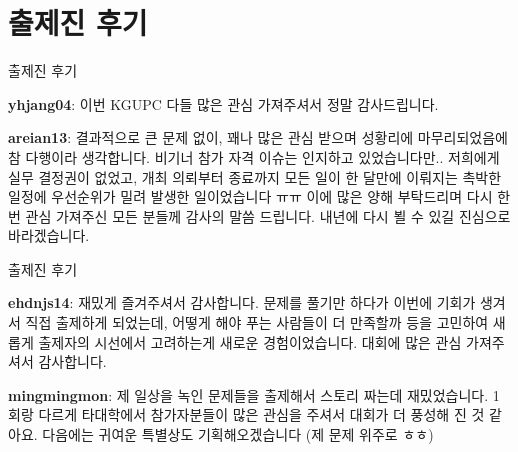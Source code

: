 
\newcommand{\authorreview}[2]{%
    \par\noindent
    {\color{solutio-purple}\bfseries #1}: #2\par
    \medskip
}

\section{출제진 후기}

\begin{frame}[label=afterword]{출제진 후기}
     \authorreview{yhjang04}{
        \textcolor{solutio-gray}{
            이번 KGUPC 다들 많은 관심 가져주셔서 정말 감사드립니다.
        }
    }

    \authorreview{areian13}{
        \textcolor{solutio-gray}{
            결과적으로 큰 문제 없이, 꽤나 많은 관심 받으며 성황리에 마무리되었음에 참 다행이라 생각합니다.
            비기너 참가 자격 이슈는 인지하고 있었습니다만.. 
            저희에게 실무 결정권이 없었고,
            개최 의뢰부터 종료까지 모든 일이 한 달만에 이뤄지는 촉박한 일정에
            우선순위가 밀려 발생한 일이었습니다 ㅠㅠ
            이에 많은 양해 부탁드리며 다시 한 번 관심 가져주신 모든 분들께 감사의 말씀 드립니다.
            내년에 다시 뵐 수 있길 진심으로 바라겠습니다.
        }
    }
\end{frame}




\begin{frame}{출제진 후기}
    \authorreview{ehdnjs14}{
        \textcolor{solutio-gray}{
            재밌게 즐겨주셔서 감사합니다. 
            문제를 풀기만 하다가 이번에 기회가 생겨서 직접 출제하게 되었는데,
            어떻게 해야 푸는 사람들이 더 만족할까 등을 고민하여
            새롭게 출제자의 시선에서 고려하는게 새로운 경험이었습니다.
            대회에 많은 관심 가져주셔서 감사합니다. 
        }
    }

    \authorreview{mingmingmon}{
        \textcolor{solutio-gray}{
            제 일상을 녹인 문제들을 출제해서 스토리 짜는데 재밌었습니다.
            1회랑 다르게 타대학에서 참가자분들이 많은 관심을 주셔서 대회가 더 풍성해 진 것 같아요.
            다음에는 귀여운 특별상도 기획해오겠습니다 (제 문제 위주로 ㅎㅎ) 
        }
    }


\end{frame}
